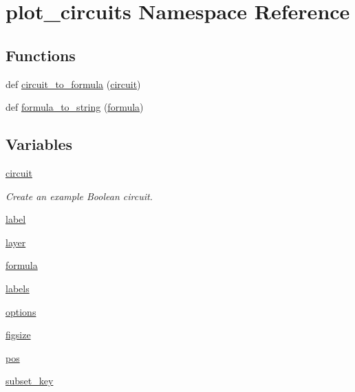 \hypertarget{namespaceplot__circuits}{}\section{plot\+\_\+circuits Namespace Reference}
\label{namespaceplot__circuits}
\subsection*{Functions}
\begin{DoxyCompactItemize}
\item 
def \hyperlink{namespaceplot__circuits_a53ff938a8c813de2fbf36fded2c89f4a}{circuit\+\_\+to\+\_\+formula} (\hyperlink{namespaceplot__circuits_a9bd6403c4050c6fd929cfb75695b5b53}{circuit})
\item 
def \hyperlink{namespaceplot__circuits_aa31d102c9728092c504ee41aa71be59e}{formula\+\_\+to\+\_\+string} (\hyperlink{namespaceplot__circuits_ad769edfa526e13970779974be2996d26}{formula})
\end{DoxyCompactItemize}
\subsection*{Variables}
\begin{DoxyCompactItemize}
\item 
\hyperlink{namespaceplot__circuits_a9bd6403c4050c6fd929cfb75695b5b53}{circuit}
\begin{DoxyCompactList}\small\item\em Create an example Boolean circuit. \end{DoxyCompactList}\item 
\hyperlink{namespaceplot__circuits_a810a118dd2957d285f2700ec674e4312}{label}
\item 
\hyperlink{namespaceplot__circuits_a9351e8d5d4497eed0e2242e1ac749d48}{layer}
\item 
\hyperlink{namespaceplot__circuits_ad769edfa526e13970779974be2996d26}{formula}
\item 
\hyperlink{namespaceplot__circuits_a3affc277564d828daacd7c8f07e57470}{labels}
\item 
\hyperlink{namespaceplot__circuits_a164f44bce07e4a2836248d08f77bf8e8}{options}
\item 
\hyperlink{namespaceplot__circuits_ab4f85a0d59ba6f09a08894be18b8c088}{figsize}
\item 
\hyperlink{namespaceplot__circuits_a2db5a916123a9b7b20e5e94d36702b62}{pos}
\item 
\hyperlink{namespaceplot__circuits_ac5065c8f146748e6d68ce15ff2d76a4b}{subset\+\_\+key}
\end{DoxyCompactItemize}


